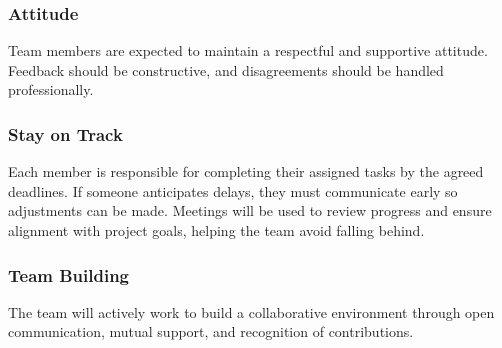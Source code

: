 \documentclass{article}
\begin{document}
\subsubsection*{Attitude}
Team members are expected to maintain a respectful and supportive attitude. Feedback should be constructive, and disagreements should be handled professionally.

\begin{comment}
\wss{What are your team's expectations regarding team members' ideas,
interactions with the team, cooperation, attitudes, and anything else regarding
team member contributions?  Do you want to introduce a code of conduct?  Do you
want a conflict resolution plan?  Can adopt existing codes of conduct.}
\end{comment}

\subsubsection*{Stay on Track}
Each member is responsible for completing their assigned tasks by the agreed deadlines. If someone anticipates delays, they must communicate early so adjustments can be made. Meetings will be used to review progress and ensure alignment with project goals, helping the team avoid falling behind.

\begin{comment}
\wss{What methods will be used to keep the team on track? How will your team
ensure that members contribute as expected to the team and that the team
performs as expected? How will your team reward members who do well and manage
members whose performance is below expectations?  What are the consequences for
someone not contributing their fair share?}
\end{comment}


\begin{comment}
\wss{You may wish to use the project management metrics collected for the TA and
instructor for this.}
\end{comment}


\begin{comment}
\wss{You can set target metrics for attendance, commits, etc.  What are the
consequences if someone doesn't hit their targets?  Do they need to bring the
coffee to the next team meeting?  Does the team need to make an appointment with
their TA, or the instructor?  Are there incentives for reaching targets early?}
\end{comment}

\subsubsection*{Team Building}
The team will actively work to build a collaborative environment through open communication, mutual support, and recognition of contributions.
\end{document}
